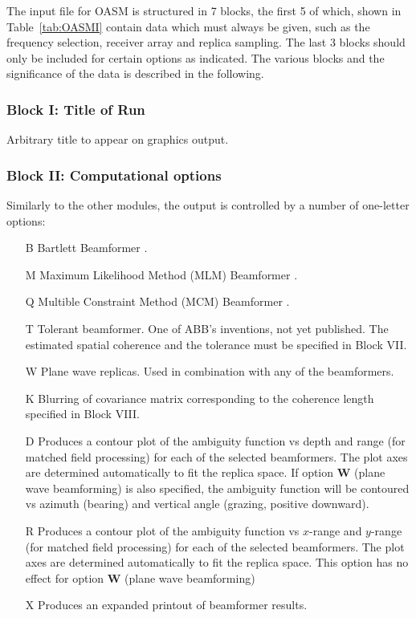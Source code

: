 The input file for OASM is structured in 7 blocks, the first 5 of
which, shown in Table~\ref{tab:OASMI} contain data which must always
be given, such as the  frequency selection,
receiver array and replica sampling. The last 3 blocks
should only be included for certain options 
as
indicated. The various blocks and the
significance of the data is described in the following.

\subsubsection{Block I: Title of Run}

Arbitrary title to appear on graphics output.

\subsubsection{Block II: Computational options}

Similarly to the other modules, the output is controlled by a number
of one-letter options:
\begin{itemize}
\item[B] Bartlett Beamformer \cite{bks:jasa88}.
\item[M] Maximum Likelihood Method (MLM) Beamformer \cite{bks:jasa88}.
\item[Q] Multible Constraint Method (MCM) Beamformer
\cite{sbk:jasa90}.
\item[T] Tolerant beamformer. One of ABB's inventions, not yet
published. The estimated spatial coherence and the tolerance must be 
specified in Block VII.
\item[W] Plane wave replicas. Used in combination with any of the beamformers.
\item[K] Blurring of covariance matrix corresponding to the coherence
length specified in Block VIII.
\item[D] Produces a contour plot of the ambiguity function vs depth
and range (for matched field processing) for each of the selected
beamformers.  The plot axes are determined
automatically to fit the replica space. If option {\bf W} (plane wave
beamforming) is also specified, the ambiguity function will be
contoured vs azimuth (bearing) and vertical angle (grazing, positive
downward).
\item[R] Produces a contour plot of the ambiguity function vs $x$-range
and $y$-range (for matched field processing) for each of the selected
beamformers. The plot axes are determined
automatically to fit the replica space. This option has no effect for
option  {\bf W} (plane wave
beamforming)
\item[X] Produces an expanded printout of beamformer results.
\end{itemize}

